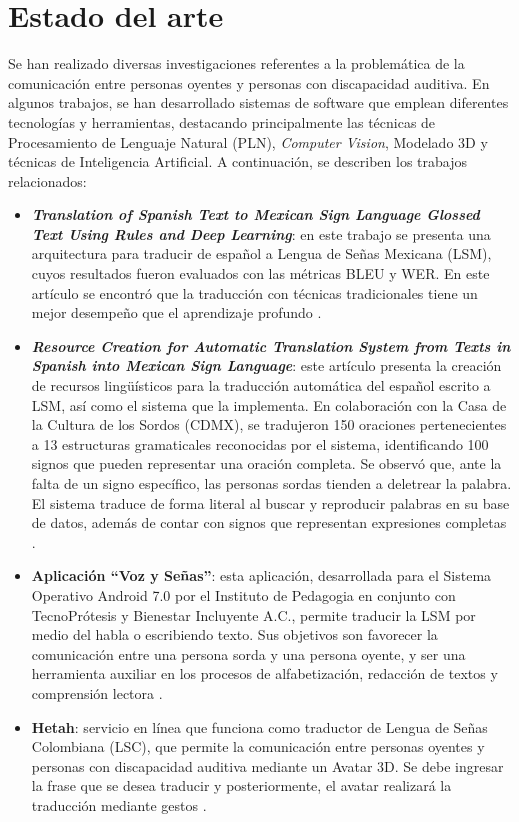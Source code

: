 \section{Estado del arte}
\label{sec:edoArte}
Se han realizado diversas investigaciones referentes a la problemática de la comunicación entre personas oyentes y personas con discapacidad auditiva. En algunos trabajos, se han desarrollado sistemas de software que emplean diferentes tecnologías y herramientas, destacando principalmente las técnicas de Procesamiento de Lenguaje Natural (PLN), \textit{Computer Vision}, Modelado 3D y técnicas de Inteligencia Artificial. A continuación, se describen los trabajos relacionados: \begin{itemize}
    \item \textbf{\textit{Translation of Spanish Text to Mexican Sign Language Glossed Text Using Rules and Deep Learning}}: en este trabajo se presenta una arquitectura para traducir de español a Lengua de Señas Mexicana (LSM), cuyos resultados fueron evaluados con las métricas BLEU y WER. En este artículo se encontró que la traducción con técnicas tradicionales tiene un mejor desempeño que el aprendizaje profundo \cite{ref8}.
    \item \textbf{\textit{Resource Creation for Automatic Translation System from Texts in Spanish into Mexican Sign Language}}: este artículo presenta la creación de recursos lingüísticos para la traducción automática del español escrito a LSM, así como el sistema que la implementa. En colaboración con la Casa de la Cultura de los Sordos (CDMX), se tradujeron 150 oraciones pertenecientes a 13 estructuras gramaticales reconocidas por el sistema, identificando 100 signos que pueden representar una oración completa. Se observó que, ante la falta de un signo específico, las personas sordas tienden a deletrear la palabra. El sistema traduce de forma literal al buscar y reproducir palabras en su base de datos, además de contar con signos que representan expresiones completas \cite{ref9}.
    \item \textbf{Aplicación “Voz y Señas”}: esta aplicación, desarrollada para el Sistema Operativo Android 7.0 por el Instituto de Pedagogia en conjunto con TecnoPrótesis y Bienestar Incluyente A.C., permite traducir la LSM por medio del habla o escribiendo texto. Sus objetivos son favorecer la comunicación entre una persona sorda y una persona oyente, y ser una herramienta auxiliar en los procesos de alfabetización, redacción de textos y comprensión lectora \cite{ref10}. 
    \item \textbf{Hetah}: servicio en línea que funciona como traductor de Lengua de Señas Colombiana (LSC), que permite la comunicación entre personas oyentes y personas con discapacidad auditiva mediante un Avatar 3D. Se debe ingresar la frase que se desea traducir y posteriormente, el avatar realizará la traducción mediante gestos \cite{ref11}. 

\end{itemize}
